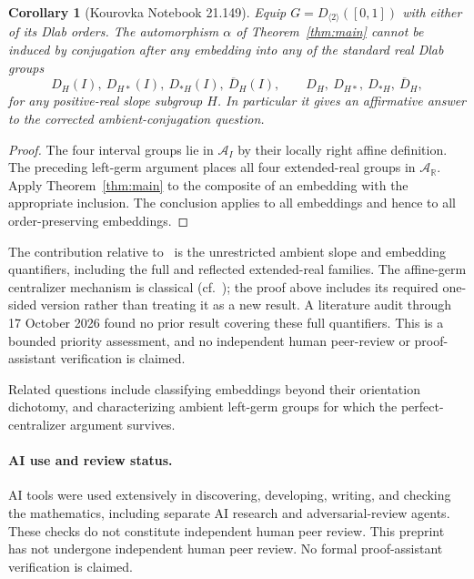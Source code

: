 \documentclass[10pt]{article}
\newtheorem{corollary}[theorem]{Corollary}
\theoremstyle{definition}
\newcommand{\R}{\mathbb R}
\newcommand{\AI}{\mathcal A_I}
\newcommand{\AR}{\mathcal A_{\R}}
\begin{document}
\begin{corollary}[Kourovka Notebook 21.149]\label{cor:kourovka}
Equip $G=D_{\langle2\rangle}([0,1])$ with either of its Dlab orders.
The automorphism $\alpha$ of Theorem~\ref{thm:main} cannot be induced
by conjugation after any embedding into any of the standard real Dlab groups
\[
D_H(I),\ D_{H*}(I),\ D_{*H}(I),\ \overline D_H(I),\qquad
D_H,\ D_{H*},\ D_{*H},\ \overline D_H,
\]
for any positive-real slope subgroup $H$. In particular it gives an
affirmative answer to the corrected ambient-conjugation question.
\end{corollary}
\begin{proof}
The four interval groups lie in $\AI$ by their locally right affine
definition. The preceding left-germ argument places all four extended-real
groups in $\AR$. Apply Theorem~\ref{thm:main} to the composite of an
embedding with the appropriate inclusion. The conclusion applies to all
embeddings and hence to all order-preserving embeddings.
\end{proof}

The contribution relative to~\cite{GYZ} is the unrestricted ambient
slope and embedding quantifiers, including the full and reflected
extended-real families. The affine-germ centralizer mechanism is classical
(cf.~\cite[Lemma~3.6 and Theorem~4.6]{Dlab}); the proof above includes
its required one-sided version rather than treating it as a new result.
A literature audit through 17 October 2026 found no prior result covering
these full quantifiers. This is a bounded priority assessment, and no
independent human peer-review or proof-assistant verification is claimed.

Related questions include classifying embeddings beyond their
orientation dichotomy, and characterizing ambient left-germ groups
for which the perfect-centralizer argument survives.

\paragraph{AI use and review status.}
AI tools were used extensively in discovering, developing, writing,
and checking the mathematics, including separate AI research and
adversarial-review agents. These checks do not constitute independent
human peer review. This preprint has not undergone independent human
peer review. No formal proof-assistant verification is claimed.
\end{document}

